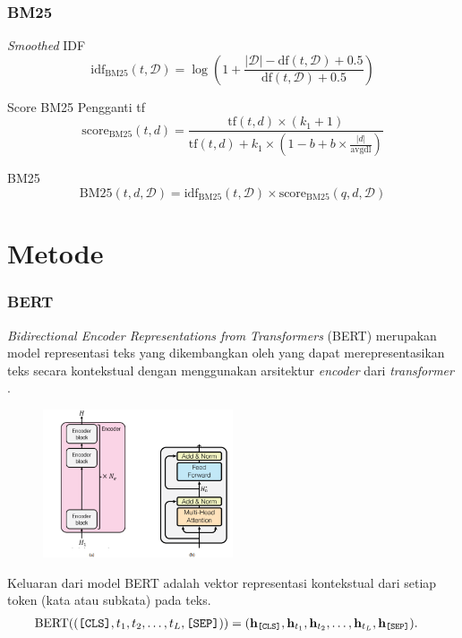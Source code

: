 \documentclass[10pt]{beamer}
\newcommand{\f}[1]{\textit{#1}}
\newcommand{\code}[1]{\texttt{#1}}
\begin{document}
\begin{frame}
    \frametitle{BM25}

    \begin{block}{\f{Smoothed} IDF}
        $$
        \text{idf}_{\text{BM25}}(t, \mathcal{D}) = \log\left(1+\frac{|\mathcal{D}| - \text{df}(t, \mathcal{D}) + 0.5}{\text{df}(t, \mathcal{D}) + 0.5}\right)
        $$
    \end{block}

    \begin{block}{Score BM25 Pengganti tf}
        $$
        \text{score}_{\text{BM25}}(t,d) = \frac{\text{tf}(t, d) \times (k_1 + 1)}{\text{tf}(t, d) + k_1 \times (1 - b + b \times \frac{|d|}{\text{avgdl}})}
        $$
    \end{block}

    \begin{block}{BM25}
        $$
        \text{BM25}(t, d, \mathcal{D}) = \text{idf}_{\text{BM25}}(t, \mathcal{D}) \times \text{score}_{\text{BM25}}(q,d,\mathcal{D})
        $$
    \end{block}
    \cite{BM25ori}
\end{frame}


\section{Metode}

\begin{frame}
    \frametitle{BERT}
   \f{Bidirectional Encoder Representations from Transformers} (BERT) merupakan model representasi teks yang dikembangkan oleh \cite{bertori} yang dapat merepresentasikan teks secara kontekstual dengan menggunakan arsitektur \f{encoder} dari \f{transformer} \citep{transformerori}.

   \begin{figure}[!ht]
    \centering
    \includegraphics[width=0.5\textwidth]{assets/pics/final-transformers-encoder.png}
    \end{figure}

    Keluaran dari model BERT adalah vektor representasi kontekstual dari setiap token (kata atau subkata) pada teks. 
    \begin{align}
    \label{equ:bert-input-start}
    \text{BERT}((\text{\code{[CLS]}}, t_1, t_2, \dots, t_L, \text{\code{[SEP]}})) &= (\mathbf{h}_{\text{\code{[CLS]}}}, \mathbf{h}_{t_1}, \mathbf{h}_{t_2}, \dots, \mathbf{h}_{t_L}, \mathbf{h}_{\text{\code{[SEP]}}}).
    \end{align}

\end{frame}
\end{document}
